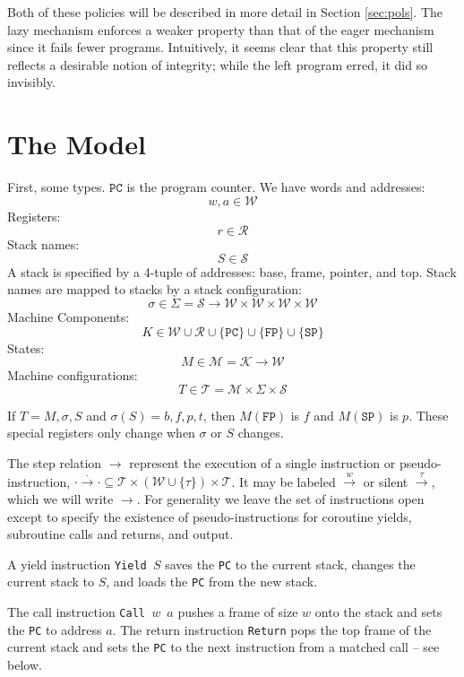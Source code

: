 \documentclass{article}
\begin{document}
      Both of these policies will be described in more detail in Section \ref{sec:pols}.
      The lazy mechanism enforces a weaker property than that of the eager mechanism since it fails fewer programs.
      Intuitively, it seems clear that this property still reflects a desirable notion of integrity;
      while the left program erred, it did so invisibly.

  \section{The Model}
    \label{sec:model}

    First, some types. \(\mathtt{PC}\) is the program counter.
    We have words and addresses:
    \[w,a \in \mathcal{W}\]
    Registers:
    \[r \in \mathcal{R}\]
    Stack names:
    \[S \in \mathcal{S}\]
    A stack is specified by a 4-tuple of addresses: base, frame, pointer, and top. Stack names are mapped to stacks
    by a stack configuration:
    \[\sigma \in \Sigma = \mathcal{S} \rightarrow \mathcal{W} \times \mathcal{W} \times \mathcal{W} \times \mathcal{W}\]
    Machine Components:
    \[K \in \mathcal{W} \cup \mathcal{R} \cup \{\mathtt{PC}\} \cup \{\mathtt{FP}\} \cup \{\mathtt{SP}\}\]
    States:
    \[M \in \mathcal{M} = \mathcal{K} \rightarrow \mathcal{W}\]
    Machine configurations:
    \[T \in \mathcal{T} = \mathcal{M} \times \Sigma \times \mathcal{S}\]

    If \(T = M,\sigma,S\) and \(\sigma(S) = b,f,p,t\), then \(M(\mathtt{FP})\) is \(f\) and \(M(\mathtt{SP})\) is \(p\).
    These special registers only change when \(\sigma\) or \(S\) changes.

    The step relation \(\longrightarrow\) represent the execution of a single instruction or pseudo-instruction,
    \(\cdot \xrightarrow{\cdot} \cdot \subseteq \mathcal{T} \times (\mathcal{W} \cup \{\tau\}) \times \mathcal{T}\).
    It may be labeled \(\xrightarrow{w}\) or silent \(\xrightarrow{\tau}\), which we will write \(\longrightarrow\).
    For generality we leave the set of instructions open except to specify the existence of pseudo-instructions for
    coroutine yields, subroutine calls and returns, and output.

    A yield instruction {\tt Yield \(S\)} saves the {\tt PC} to the current stack, changes the current
    stack to \(S\), and loads the {\tt PC} from the new stack.

    The call instruction {\tt Call \(w\) \(a\)} pushes a frame of size \(w\) onto the stack and sets the {\tt PC}
    to address \(a\). The return instruction {\tt Return} pops the top frame of the current stack and sets
    the {\tt PC} to the next instruction from a matched call -- see below.
\end{document}
